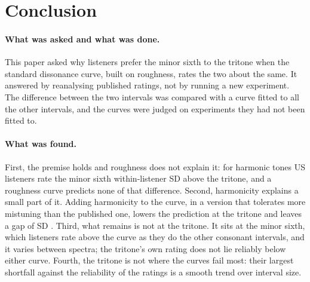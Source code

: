 \documentclass[11pt,a4paper]{article}
\begin{document}
\section{Conclusion}

\paragraph{What was asked and what was done.}
This paper asked why listeners prefer the minor sixth to the tritone when the standard
dissonance curve, built on roughness, rates the two about the same. It answered by
reanalysing published ratings, not by running a new experiment. The difference between the
two intervals was compared with a curve fitted to all the other intervals, and the curves
were judged on experiments they had not been fitted to.

\paragraph{What was found.}
First, the premise holds and roughness does not explain it: for harmonic tones US listeners
rate the minor sixth \poolGapObsHarm{} within-listener SD above the tritone, and a roughness
curve predicts none of that difference. Second, harmonicity explains a small part of it.
Adding harmonicity to the curve, in a version that tolerates more mistuning than the
published one, lowers the prediction at the tritone and leaves a gap of \primGap{} SD
\primGapCI. Third, what remains is not at the tritone. It sits at the minor sixth, which
listeners rate above the curve as they do the other consonant intervals, and it varies
between spectra; the tritone's own rating does not lie reliably below either curve. Fourth,
the tritone is not where the curves fail most: their largest shortfall against the
reliability of the ratings is a smooth trend over interval size.
\end{document}
